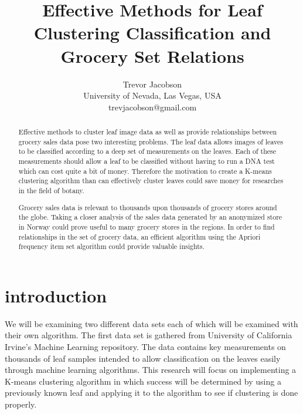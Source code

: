\documentclass[times, 12pt,twocolumn]{article}
\begin{document}
\title{Effective Methods for Leaf Clustering Classification and Grocery Set Relations}
\author{Trevor Jacobson\\
University of Nevada, Las Vegas, USA\\
trevjacobson@gmail.com\\}



\maketitle

\thispagestyle{empty}

\begin{abstract}
Effective methods to cluster leaf image data as well as provide relationships between grocery sales data pose two interesting problems.
The leaf data allows images of leaves to be classified according to a deep set of measurements on the leaves. Each of these measurements
should allow a leaf to be classified without having to run a DNA test which can cost quite a bit of money. Therefore the motivation to
create a K-means clustering algorithm than can effectively cluster leaves could save money for researches in the field of botany.

Grocery sales data is relevant to thousands upon thousands of grocery stores around the globe. Taking a closer analysis of the sales
data generated by an anonymized store in Norway could prove useful to many grocery stores in the regions. In order to find relationships
in the set of grocery data, an efficient algorithm using the Apriori frequency item set algorithm could provide valuable insights.


\end{abstract}

\section{introduction}
We will be examining two different data sets each of which will be examined with their own algorithm. The first data set is gathered from
University of California Irvine's Machine Learning repository.\cite{Art4} The data contains key measurements on thousands of leaf samples intended to allow
classification on the leaves easily through machine learning algorithms. This research will focus on implementing a K-means clustering algorithm
in which success will be determined by using a previously known leaf and applying it to the algorithm to see if clustering is done properly.
\end{document}
